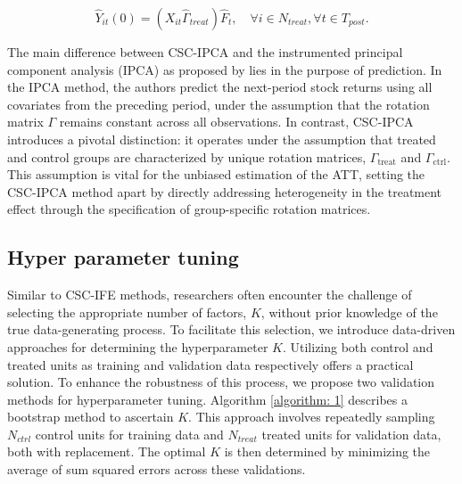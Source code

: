 \documentclass[12pt]{article}
\begin{document}
\begin{equation}
\hat{Y}_{it}(0) = (X_{it} \hat{\Gamma}_{treat}) \hat{F}_{t}, \quad \forall i \in N_{treat}, \forall t \in T_{post}.
\tag{5}
\end{equation}

The main difference between CSC-IPCA and the instrumented principal component analysis (IPCA) as proposed by \cite{kelly2020instrumented} lies in the purpose of prediction. In the IPCA method, the authors predict the next-period stock returns using all covariates from the preceding period, under the assumption that the rotation matrix $\Gamma$ remains constant across all observations. In contrast, CSC-IPCA introduces a pivotal distinction: it operates under the assumption that treated and control groups are characterized by unique rotation matrices, $\Gamma_{\text{treat}}$ and $\Gamma_{\text{ctrl}}$. This assumption is vital for the unbiased estimation of the ATT, setting the CSC-IPCA method apart by directly addressing heterogeneity in the treatment effect through the specification of group-specific rotation matrices.

\subsection{Hyper parameter tuning}
Similar to CSC-IFE methods, researchers often encounter the challenge of selecting the appropriate number of factors, $K$, without prior knowledge of the true data-generating process. To facilitate this selection, we introduce data-driven approaches for determining the hyperparameter $K$. Utilizing both control and treated units as training and validation data respectively offers a practical solution. To enhance the robustness of this process, we propose two validation methods for hyperparameter tuning. Algorithm \ref{algorithm: 1} describes a bootstrap method to ascertain $K$. This approach involves repeatedly sampling $N_{ctrl}$ control units for training data and $N_{treat}$ treated units for validation data, both with replacement. The optimal $K$ is then determined by minimizing the average of sum squared errors across these validations.
\end{document}
